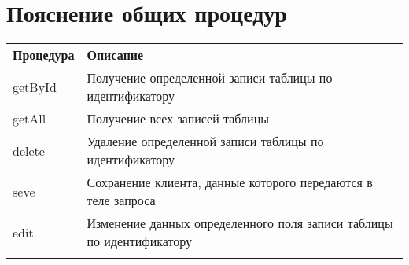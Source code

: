\section*{Пояснение общих процедур}
\begin{table}[htbp]
    \centering
    \begin{tabularx}{\textwidth}{bm}
    
    	\rowcolor{titleColor}
    	\textbf{Процедура} & \textbf{Описание} \\  
        
        getById & Получение определенной записи таблицы по идентификатору\\   \rowcolor{codeColor}
        getAll & Получение всех записей таблицы \\
        delete & Удаление определенной записи таблицы по идентификатору \\   \rowcolor{codeColor}
        seve & Сохранение клиента, данные которого передаются в теле запроса \\
        edit & Изменение данных определенного поля записи таблицы по идентификатору \\   \rowcolor{codeColor}
    \end{tabularx}
\end{table}